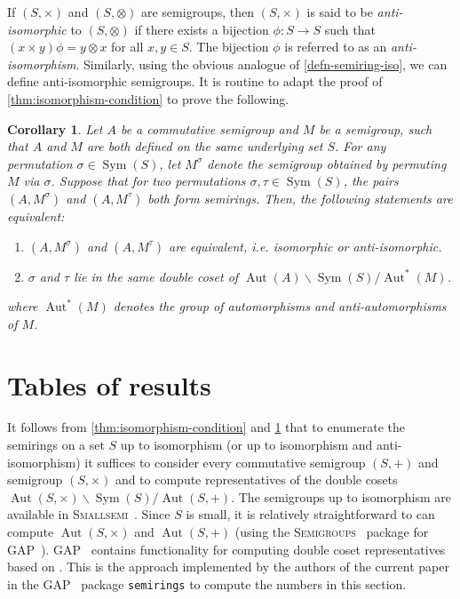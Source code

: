 \documentclass{article}
\theoremstyle{definition}
\theoremstyle{plain}
\newtheorem{cor}[defn]{Corollary}
\newcommand{\GAP}{\textsc{GAP}~\cite{GAP4}\xspace}
\newcommand{\Smallsemi}{\textsc{Smallsemi}~\cite{Smallsemi}\xspace}
\newcommand{\Semigroups}{\textsc{Semigroups}~\cite{Semigroups}\xspace}
\newcommand{\Sym}{\operatorname{Sym}}
\newcommand{\Aut}{\operatorname{Aut}}
\begin{document}
If $(S, \times)$ and $(S, \otimes)$ are semigroups, then $(S, \times)$ is said
to be \textit{anti-isomorphic} to $(S, \otimes)$ if there exists a bijection
$\phi: S \to S$ such that $(x\times y)\phi = y\otimes x$ for all $x, y\in S$.
The bijection $\phi$ is referred to as an \textit{anti-isomorphism}. Similarly,
using the obvious analogue of \cref{defn-semiring-iso}, we can define
anti-isomorphic semigroups. It is routine to adapt the proof of
\cref{thm:isomorphism-condition} to prove the following.


\begin{cor}
  \label{cor:equiv-condition}
  Let \(A\) be a commutative semigroup and \(M\) be a semigroup, such
  that \(A\) and \(M\) are both defined on the same underlying set
  \(S\). For any permutation \(\sigma \in \operatorname{Sym}(S)\),
  let \(M^\sigma\) denote the semigroup obtained by permuting \(M\)
  via \(\sigma\). Suppose that for two permutations \(\sigma,
  \tau\in\operatorname{Sym}(S)\), the pairs \((A,M^\sigma)\) and
  \((A,M^\tau)\) both form semirings. Then, the following statements
  are equivalent:
  \begin{enumerate}
    \item \((A, M^\sigma)\) and \((A, M^\tau)\) are equivalent, i.e.
      isomorphic or anti-isomorphic.
    \item \(\sigma\) and \(\tau\) lie in the same double coset of
      \(\operatorname{Aut}(A) \backslash \operatorname{Sym}(S) /
      \operatorname{Aut}^*(M)\).
  \end{enumerate}
  where \(\operatorname{Aut}^*(M)\) denotes the group of
  automorphisms and anti-automorphisms of \(M\).
\end{cor}

\section{Tables of results}

It follows from \cref{thm:isomorphism-condition} and
\cref{cor:equiv-condition} that to enumerate the
semirings on a set $S$ up to isomorphism (or up to isomorphism and
anti-isomorphism) it suffices to consider every
commutative semigroup $(S, +)$ and semigroup $(S, \times)$
and to compute representatives of the double cosets \(\Aut(S, \times)
\backslash \Sym(S) / \Aut(S, +)\). The semigroups up to isomorphism are
available in \Smallsemi.  Since $S$ is small, it is relatively
straightforward to can compute $\Aut(S, \times)$ and $\Aut(S, +)$ (using the
\Semigroups package for \GAP).
\GAP contains functionality for computing double coset
representatives based on \cite{}. This is the approach implemented by the
authors of the current paper in the \GAP package \texttt{semirings} to compute
the numbers in this section.
\end{document}
